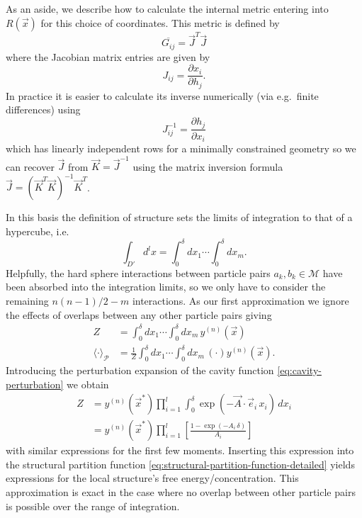\documentclass[11pt,twoside]{report}
\begin{document}
As an aside, we describe how to calculate the internal metric entering into $R(\vec{x})$ for this choice of coordinates.
This metric is defined by
\begin{equation*}
  \overline{G_{ij}} = \vec{J}^T \vec{J}
\end{equation*}
where the Jacobian matrix entries are given by
\begin{equation*}
  J_{ij} = \frac{\partial x_i}{\partial h_j}.
\end{equation*}
In practice it is easier to calculate its inverse numerically (via e.g.\ finite differences) using
\begin{equation*}
  J_{ij}^{-1}
  = \frac{\partial h_j}{\partial x_i}
\end{equation*}
which has linearly independent rows for a minimally constrained geometry so we can recover $\vec{J}$ from $\vec{K} = \vec{J}^{-1}$ using the matrix inversion formula $\vec{J} = (\vec{K}^T\vec{K})^{-1} \vec{K}^T$.

In this basis the definition of structure sets the limits of integration to that of a hypercube, i.e.\
\begin{equation*}
  \int_{D'} d^l x
  =
  \int_0^\delta dx_1 \cdots \int_0^\delta dx_m.
\end{equation*}
Helpfully, the hard sphere interactions between particle pairs $a_k,b_k \in \mathcal{M}$ have been absorbed into the integration limits, so we only have to consider the remaining $n(n-1)/2 - m$ interactions.
As our first approximation we ignore the effects of overlaps between any other particle pairs giving
\begin{subequations}
  \begin{align}
    Z
    &=
    \int_0^\delta dx_1 \cdots \int_0^\delta dx_m
    \, y^{(n)}(\vec{x})
    \\
    \langle \cdot \rangle_\mathcal{P}
    &=
    \frac{1}{Z}
    \int_0^\delta dx_1 \cdots \int_0^\delta dx_m
    \, (\cdot) y^{(n)}(\vec{x}).
  \end{align}
\end{subequations}
Introducing the perturbation expansion of the cavity function \eqref{eq:cavity-perturbation} we obtain
\begin{equation}
  \begin{split}
    Z
    &=
    y^{(n)}(\vec{x}^*)
    \prod_{i=1}^l
    \int_0^\delta
    \exp{\left( -\vec{A} \cdot \vec{e}_i \, x_i \right)}
    \, dx_i
    \\ &=
    y^{(n)}(\vec{x}^*)
    \prod_{i=1}^l
    \left[
    \frac{1 - \exp{\left( -A_i \, \delta \right)}}{A_i}
    \right]
  \end{split}
\end{equation}
with similar expressions for the first few moments.
Inserting this expression into the structural partition function \eqref{eq:structural-partition-function-detailed} yields expressions for the local structure's free energy/concentration.
This approximation is exact in the case where no overlap between other particle pairs is possible over the range of integration.
\end{document}
